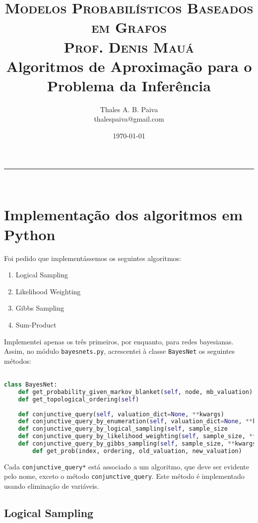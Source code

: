 \documentclass[paper=a4, fontsize=11pt]{scrartcl} %
\title{	
\normalfont \normalsize 
\textsc{Modelos Probabilísticos Baseados em Grafos} \\ 
\textsc{Prof. Denis Mauá} \\ [25pt]
\huge Algoritmos de Aproximação para o \\ Problema da Inferência 
}
\author{Thales A. B. Paiva \\ thalespaiva@gmail.com} %
\date{\today} %
\numberwithin{equation}{subsection}
\numberwithin{figure}{subsection}
\numberwithin{table}{subsection}
\numberwithin{definition}{subsection}
\numberwithin{theorem}{subsection}
\numberwithin{property}{subsection}
\numberwithin{proposition}{subsection}
\numberwithin{equation}{section}
\numberwithin{figure}{section}
\numberwithin{table}{section}
\numberwithin{definition}{section}
\numberwithin{theorem}{section}
\numberwithin{property}{section}
\numberwithin{proposition}{section}
\newcommand{\horrule}[1]{\rule{\linewidth}{#1}} %
\begin{document}
\maketitle %
\horrule{1pt} \\[0.5cm] %

\tableofcontents

\pagebreak
\section{Implementação dos algoritmos em Python}

Foi pedido que implementássemos os seguintes algoritmos:
\begin{enumerate}
  \item Logical Sampling
  \item Likelihood Weighting
  \item Gibbs Sampling
  \item Sum-Product
\end{enumerate}

Implementei apenas os três primeiros, por enquanto, para redes bayesianas. Assim, no módulo \verb|bayesnets.py|, 
acrescentei à classe \verb|BayesNet| os seguintes métodos:

\begin{lstlisting}[language=python]

class BayesNet:
    def get_probability_given_markov_blanket(self, node, mb_valuation)
    def get_topological_ordering(self)
    
    def conjunctive_query(self, valuation_dict=None, **kwargs)
    def conjunctive_query_by_enumeration(self, valuation_dict=None, **kwargs)
    def conjunctive_query_by_logical_sampling(self, sample_size
    def conjunctive_query_by_likelihood_weighting(self, sample_size, **kwargs)
    def conjunctive_query_by_gibbs_sampling(self, sample_size, **kwargs)
        def get_prob(index, ordering, old_valuation, new_valuation)

\end{lstlisting}


Cada \verb|conjunctive_query*| está associado a um algoritmo, que deve ser evidente pelo nome, exceto o método
\verb|conjunctive_query|. Este método é implementado usando eliminação de variáveis.


\subsection{Logical Sampling}
\end{document}
